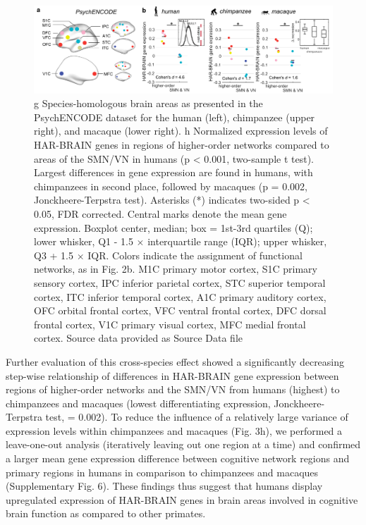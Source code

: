 \begin{refsection}
\begin{figure}[h]
    \centering
    \includegraphics[width=\linewidth]{images/harFig5.png}
    \caption{g Species-homologous brain areas as presented in the PsychENCODE dataset for the human (left), chimpanzee (upper right), and macaque (lower right). h Normalized expression levels of HAR-BRAIN genes in regions of higher-order networks compared to areas of the SMN/VN in humans (p < 0.001, two-sample t test). Largest differences in gene expression are found in humans, with chimpanzees in second place, followed by macaques (p = 0.002, Jonckheere-Terpstra test). Asterisks (*) indicates two-sided p < 0.05, FDR corrected. Central marks denote the mean gene expression. Boxplot center, median; box = 1st-3rd quartiles (Q); lower whisker, Q1 - 1.5 $\times$ interquartile range (IQR); upper whisker, Q3 + 1.5 $\times$ IQR. Colors indicate the assignment of functional networks, as in Fig. 2b. M1C primary motor cortex, S1C primary sensory cortex, IPC inferior parietal cortex, STC superior temporal cortex, ITC inferior temporal cortex, A1C primary auditory cortex, OFC orbital frontal cortex, VFC ventral frontal cortex, DFC dorsal frontal cortex, V1C primary visual cortex, MFC medial frontal cortex. Source data provided as Source Data file}
    \label{harFig5}
\end{figure}


Further evaluation of this cross-species effect showed a significantly decreasing step-wise relationship of differences in HAR-BRAIN gene expression between regions of higher-order networks and the SMN/VN from humans (highest) to chimpanzees and macaques (lowest differentiating expression, Jonckheere-Terpstra test, \pval = 0.002). To reduce the influence of a relatively large variance of expression levels within chimpanzees and macaques (Fig. 3h), we performed a leave-one-out analysis (iteratively leaving out one region at a time) and confirmed a larger mean gene expression difference between cognitive network regions and primary regions in humans in comparison to chimpanzees and macaques (Supplementary Fig. 6). These findings thus suggest that humans display upregulated expression of HAR-BRAIN genes in brain areas involved in cognitive brain function as compared to other primates.


\end{refsection}
